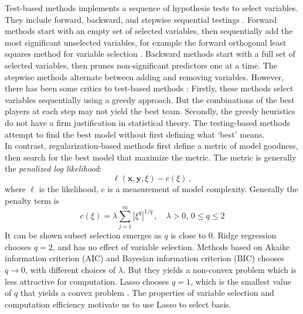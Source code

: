 \documentclass[a4paper,onecolumn]{article}
\theoremstyle{remark}
\begin{document}
\noindent Test-based methods implements a sequence of hypothesis tests to select variables.
They include forward, backward, and stepwise sequential testings
\cite{stepwise variable selection, Critical review of variable selection}.
Forward methods start with an empty set of selected variables, then
sequentially add the most significant unselected variables,
for example the
forward orthogonal least squares method for variable selection \cite{Billing feature selection}.
Backward methods start with a full set of selected variables, then
prunes non-significant predictors one at a time.
The stepwise methods alternate between adding and removing variables. 
However, there has been some critics to test-based methods
\cite{Critical review of variable selection}:
Firstly, these methods select variables sequentially using a greedy approach.
But the combinations of the best players at each step may not yield the best team.
Secondly, the greedy heuristics do not have a firm justification in statistical theory. 
The testing-based methods attempt to find the best model without first defining what
`best' means.\\

\noindent In contrast, regularization-based methods first define a metric of model goodness,
then search for the best model that maximize the metric. 
The metric is generally the \emph{penalized log likelihood}:
\begin{equation}
    \ell(\mathbf{x},\mathbf{y},\xi) - c(\xi)\,,
\end{equation}
where $\ell$ is the likelihood, $c$ is a measurement of model complexity.
Generally the penalty term is
\begin{equation}
    c(\xi) = \lambda \sum_{j=1}^m |\xi^q|^{1/q}\,,\quad \lambda>0,\, 0\le q\le 2
\end{equation}
It can be shown subset selection emerges as $q$ is close to $0$.
Ridge regression chooses $q=2$, and has no effect of variable selection.
Methods based on Akaike information criterion (AIC) \cite{AIC} and Bayesian information
criterion (BIC) \cite{BIC} chooses $q\rightarrow 0$, with different choices of $\lambda$.
But they yields a non-convex problem which is less attractive for computation.
Lasso chooses $q=1$, which is the smallest value of $q$
that yields a convex problem \cite{Lasso variable selection}. 
The properties of variable selection and
computation efficiency motivate us to use Lasso to select basis.\\
\end{document}
